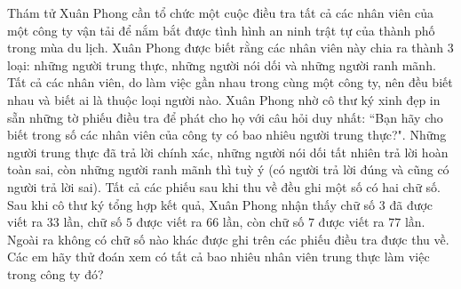 \begin{multicols}{2}
	Thám tử Xuân Phong cần tổ chức một cuộc điều tra tất cả các nhân viên của một công ty vận tải để nắm bắt được tình hình an ninh trật tự của thành phố trong mùa du lịch. Xuân Phong được biết rằng các nhân viên này chia ra thành $3$ loại: những người trung thực, những người nói dối và những người ranh mãnh. Tất cả các nhân viên, do làm việc gần nhau trong cùng một công ty, nên đều biết nhau và biết ai là thuộc loại người nào. Xuân Phong nhờ cô thư ký xinh đẹp in sẵn những tờ phiếu điều tra để phát cho họ với câu hỏi duy nhất: ``Bạn hãy cho biết trong số các nhân viên của công ty có bao nhiêu người trung thực?". Những người trung thực đã trả lời chính xác, những người nói dối tất nhiên trả lời hoàn toàn sai, còn những người ranh mãnh thì tuỳ ý (có người trả lời đúng và cũng có người trả lời sai). Tất cả các phiếu sau khi thu về đều ghi một số có hai chữ số. Sau khi cô thư ký tổng hợp kết quả, Xuân Phong nhận thấy chữ số $3$ đã được viết ra $33$ lần, chữ số $5$ được viết ra $66$ lần, còn chữ số $7$ được viết ra $77$ lần. Ngoài ra không có chữ số nào khác được ghi trên các phiếu điều tra được thu về. Các em hãy thử đoán xem có tất cả bao nhiêu nhân viên trung thực làm việc trong công ty đó?

\end{multicols}
